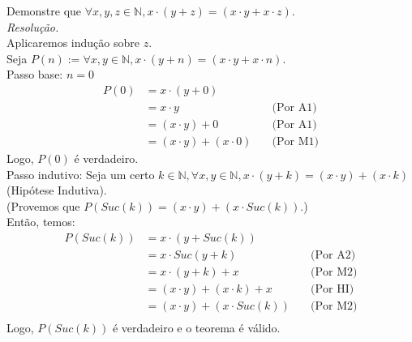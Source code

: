 Demonstre que $\forall x,y, z \in \mathbb{N}, x \cdot (y + z) = (x \cdot y + x \cdot z)$. \\
\emph{Resolução.}\\
Aplicaremos indução sobre $z$. \\
Seja $P(n) := \forall x, y \in \mathbb{N}, x \cdot (y + n) = (x \cdot y + x \cdot n)$. \\
Passo base: $n = 0$
\begin{align*}
	P(0) & = x \cdot (y + 0)                                   \\
	     & = x \cdot y                 & \quad \text{(Por A1)} \\
	     & = (x \cdot y) + 0           & \quad \text{(Por A1)} \\
	     & = (x \cdot y) + (x \cdot 0) & \quad \text{(Por M1)}
\end{align*}
Logo, $P(0)$ é verdadeiro. \\
Passo indutivo: Seja um certo $k \in \mathbb{N}, \forall x,y \in \mathbb{N}, x \cdot (y + k) = (x \cdot y) + (x \cdot k)$ (Hipótese Indutiva). \\
(Provemos que $P(Suc(k)) = (x \cdot y) + (x \cdot Suc(k))$.) \\
Então, temos:
\begin{align*}
	P(Suc(k)) & = x \cdot (y + Suc(k))                                   \\
	          & = x \cdot Suc(y + k)             & \quad \text{(Por A2)} \\
	          & = x \cdot (y + k) + x            & \quad \text{(Por M2)} \\
	          & = (x \cdot y) + (x \cdot k) + x  & \quad \text{(Por HI)} \\
	          & = (x \cdot y) + (x \cdot Suc(k)) & \quad \text{(Por M2)} \\
\end{align*}
Logo, $P(Suc(k))$ é verdadeiro e o teorema é válido.